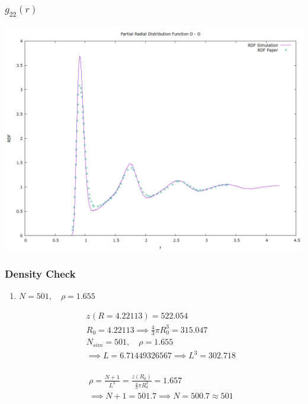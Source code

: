 \documentclass[a4paper,11pt,twoside]{article}
\begin{document}
\subsubsection{\(g_{22}(r)\)}
\label{sec:orgb4307b8}

\begin{center}
\includegraphics[width=.9\linewidth]{../../runs/nvt_cool_sample_rdf/plots/rdf_22.png}
\end{center}
\subsubsection{Density Check}
\label{sec:org61e2e94}
\begin{enumerate}
\item \(N = 501, \quad \rho = 1.655\)
\label{sec:orgbb879d4}

\begin{align*}
z_{}(R = 4.22113) = 522.054 \\
R_0 = 4.22113 \implies \frac{4}{3}\pi R_0^3 = 315.047 \\
N_{sim} = 501, \quad \rho = 1.655 \\
\implies L = 6.71449326567 \implies L^3 = 302.718 \\
\end{align*}

\begin{align*}
\rho = \frac{N + 1}{L^3} = \frac{z(R_0)}{\frac{4}{3}\pi R_0^3} = 1.657 \\
\implies N + 1 = 501.7 \implies N = 500.7 \approx 501
\end{align*}
\end{enumerate}
\end{document}
